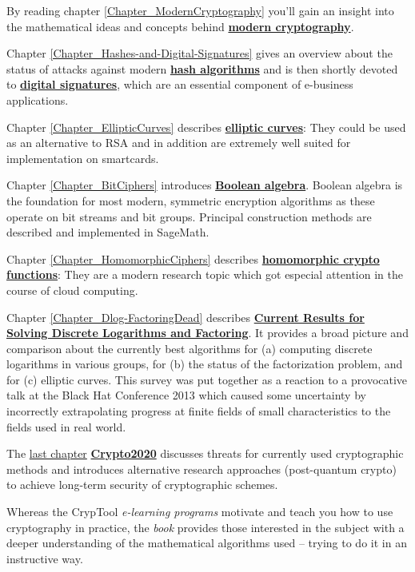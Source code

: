 By reading chapter \ref{Chapter_ModernCryptography}
you'll gain an insight into the mathematical ideas and concepts behind
\hyperlink{Chapter_ModernCryptography}{\bf modern cryptography}.

Chapter \ref{Chapter_Hashes-and-Digital-Signatures} gives
an overview about the status of attacks against modern
\hyperlink{Chapter_Hashes-and-Digital-Signatures}{\bf hash algorithms}
and is then shortly devoted to \hyperlink{Chapter_Hashes-and-Digital-Signatures}
{\bf digital signatures},
which are an essential component of e-business applications.

Chapter \ref{Chapter_EllipticCurves} describes \hyperlink{Chapter_EllipticCurves}
{\bf elliptic curves}: They could be used as an alternative to RSA and in addition
are extremely well suited for implementation on smartcards.

Chapter \ref{Chapter_BitCiphers} introduces \hyperlink{Chapter_BitCiphers}{\bf Boolean algebra}.
Boolean algebra is the foundation for most modern, symmetric encryption algorithms
as these operate on bit streams and bit groups. Principal construction
methods are described and implemented in SageMath.

Chapter \ref{Chapter_HomomorphicCiphers} describes
\hyperlink{Chapter_HomomorphicCiphers}{\bf homomorphic crypto
functions}: They are a modern research topic which got especial attention
in the course of cloud computing.

Chapter \ref{Chapter_Dlog-FactoringDead} describes
\hyperlink{Chapter_Dlog-FactoringDead}{\bf Current Results
for Solving Discrete Logarithms and Factoring}.
It provides a broad picture and comparison about the currently best
algorithms for (a) computing discrete logarithms in various groups,
for (b) the status of the factorization problem, and for (c) elliptic
curves. This survey was put together as a reaction to a provocative
talk at the Black Hat Conference 2013 which caused some uncertainty
by incorrectly extrapolating progress at finite fields of small
characteristics to the fields used in real world.

The \hyperlink{Chapter_Crypto2020}{last chapter}
\hyperlink{Chapter_Crypto2020}{\bf Crypto2020}
discusses threats for currently used cryptographic methods and introduces
alternative research approaches (post-quantum crypto) to achieve long-term
security of cryptographic schemes.

Whereas the CrypTool \textit{e-learning programs} motivate
and teach you how to use cryptography in practice, the \textit{book} provides
those interested in the subject with a deeper understanding of the mathematical
algorithms used -- trying to do it in an instructive way.

